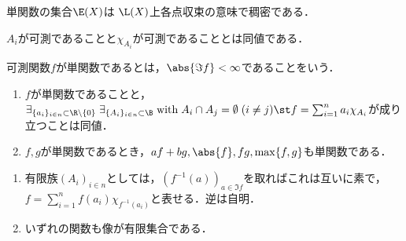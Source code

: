 \documentclass[uplatex, dvipdfmx]{jsreport}
\begin{document}
\begin{tcolorbox}[colframe=ForestGreen, colback=ForestGreen!10!white,breakable,colbacktitle=ForestGreen!40!white,coltitle=black,fonttitle=\bfseries\sffamily,
title=]
    単関数の集合$\E(X)$は
    $\L(X)$上各点収束の意味で稠密である．
    
    $A_i$が可測であることと$\chi_{A_i}$が可測であることとは同値である．
\end{tcolorbox}

\begin{definition}
    可測関数$f$が単関数であるとは，$\abs{\Im f}<\infty$であることをいう．
\end{definition}

\begin{lemma}\mbox{}
    \begin{enumerate}
        \item $f$が単関数であることと，$\exists_{\{a_i\}_{i\in n}\subset\R\setminus\{0\}}\;\exists_{\{A_i\}_{i\in n}\subset\B}\;\mathrm{with}\;A_i\cap A_j=\emptyset\;(i\ne j)\st f=\sum_{i=1}^na_i\chi_{A_i}$が成り立つことは同値．
        \item $f,g$が単関数であるとき，$af+bg,\abs{f},fg,\max\{f,g\}$も単関数である．
    \end{enumerate}
\end{lemma}
\begin{Proof}\mbox{}
    \begin{enumerate}
        \item 有限族$(A_i)_{i\in n}$としては，$(f^{-1}(a))_{a\in\Im f}$を取ればこれは互いに素で，$f=\sum^n_{i=1}f(a_i)\chi_{f^{-1}(a_i)}$と表せる．逆は自明．
        \item いずれの関数も像が有限集合である．
    \end{enumerate}
\end{Proof}
\end{document}
